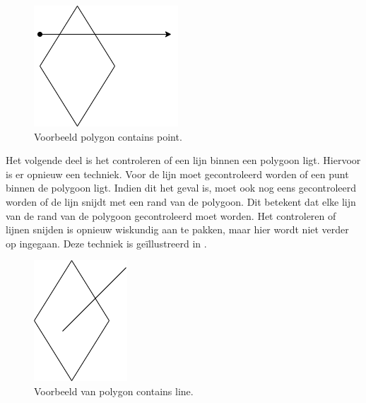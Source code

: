\begin{figure}
    \centering
    \includegraphics[width=0.5\linewidth]{images/polygon_contains_point.png}
    \caption{Voorbeeld polygon contains point.}
    \label{fig:polygon_contains_point}
\end{figure}

Het volgende deel is het controleren of een lijn binnen een polygoon ligt. Hiervoor is er opnieuw een techniek. Voor de lijn moet gecontroleerd worden of een punt binnen de polygoon ligt. Indien dit het geval is, moet ook nog eens gecontroleerd worden of de lijn snijdt met een rand van de polygoon. Dit betekent dat elke lijn van de rand van de polygoon gecontroleerd moet worden. Het controleren of lijnen snijden is opnieuw wiskundig aan te pakken, maar hier wordt niet verder op ingegaan. Deze techniek is geïllustreerd in .

\begin{figure}
    \centering
    \includegraphics[width=0.3\linewidth]{images/polygon_contains_line.png}
    \caption{Voorbeeld van polygon contains line.}
    \label{fig:polygon_contains_line}
\end{figure}

